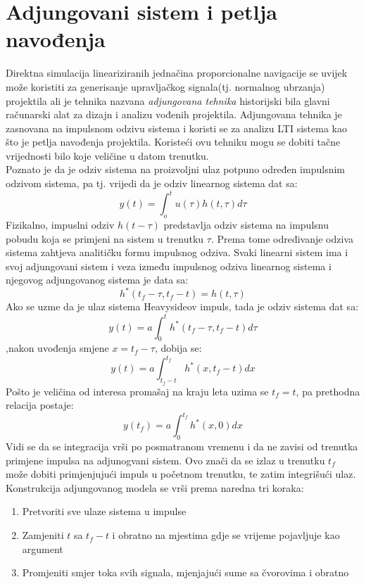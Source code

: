 \section{Adjungovani sistem i petlja navođenja}
Direktna simulacija lineariziranih jednačina proporcionalne navigacije se uvijek može
koristiti za generisanje upravljačkog signala(tj. normalnog ubrzanja) projektila
ali je tehnika nazvana \textit{adjungovana tehnika} historijski bila glavni računarski 
alat za dizajn i analizu vođenih projektila. Adjungovana tehnika je zasnovana 
na impulsnom odzivu sistema i koristi se  za analizu LTI sistema kao što je 
petlja navođenja projektila. Koristeći ovu tehniku mogu se dobiti tačne vrijednosti 
bilo koje veličine u datom trenutku.\\
Poznato je da je odziv sistema na proizvoljni ulaz potpuno određen impulsnim odzivom sistema, pa 
tj. vrijedi da je odziv linearnog sistema dat sa:
\begin{equation}
    y(t)=\int_o^tu(\tau)h(t,\tau)d\tau
\end{equation}
Fizikalno, impuslni odziv $h(t-\tau)$ predstavlja odziv sistema na impulsnu pobudu koja 
se primjeni na sistem u trenutku $\tau$. Prema tome određivanje odziva sistema zahtjeva analitičku 
formu impulsnog odziva. Svaki linearni sistem ima i svoj adjungovani sistem i veza između impulsnog 
odziva linearnog sistema i njegovog adjungovanog sistema je data sa:
\begin{equation}
    h^*(t_f-\tau,t_f-t)=h(t,\tau)
\end{equation}
Ako se uzme da je ulaz sistema Heavysideov impuls, tada je odziv sistema dat sa:
\begin{equation}
    y(t)=a\int_0^t h^*(t_f-\tau,t_f-t)d\tau
\end{equation}
,nakon uvođenja smjene $x=t_f-\tau$, dobija se:
\begin{equation}
    y(t)=a\int_{t_f-t}^{t_f}h^*(x,t_f-t)dx
\end{equation}
Pošto je veličina od interesa promašaj na kraju leta uzima se $t_f=t$, pa prethodna relacija
postaje:
\begin{equation}
    y(t_f)=a\int_{0}^{t_f}h^*(x,0)dx
\end{equation}
Vidi se da se integracija vrši po posmatranom vremenu i da ne zavisi od trenutka primjene impulsa na adjunogvani sistem. 
Ovo znači da se izlaz u trenutku $t_f$ može dobiti primjenjujući impuls u početnom trenutku, te zatim integrišući ulaz. 
Konstrukcija adjungovanog modela se vrši prema naredna tri koraka:
\begin{enumerate}
    \item Pretvoriti sve ulaze sistema u impulse
    \item Zamjeniti $t$ sa $t_f-t$ i obratno na mjestima gdje se vrijeme pojavljuje kao argument
    \item Promjeniti smjer toka svih signala, mjenjajući sume sa čvorovima i obratno
\end{enumerate}

